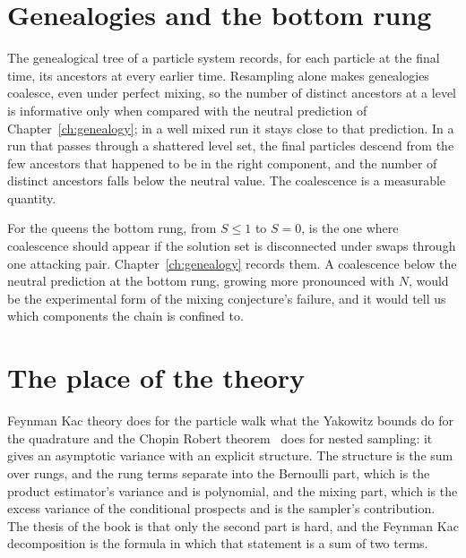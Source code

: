 \section{Genealogies and the bottom rung}

The genealogical tree of a particle system records, for each particle at the final time, its ancestors at every earlier time. Resampling alone makes genealogies coalesce, even under perfect mixing, so the number of distinct ancestors at a level is informative only when compared with the neutral prediction of Chapter~\ref{ch:genealogy}; in a well mixed run it stays close to that prediction. In a run that passes through a shattered level set, the final particles descend from the few ancestors that happened to be in the right component, and the number of distinct ancestors falls below the neutral value. The coalescence is a measurable quantity.

For the queens the bottom rung, from $S \le 1$ to $S = 0$, is the one where coalescence should appear if the solution set is disconnected under swaps through one attacking pair. Chapter~\ref{ch:genealogy} records them. A coalescence below the neutral prediction at the bottom rung, growing more pronounced with $N$, would be the experimental form of the mixing conjecture's failure, and it would tell us which components the chain is confined to.

\section{The place of the theory}

Feynman Kac theory does for the particle walk what the Yakowitz bounds do for the quadrature and the Chopin Robert theorem~\cite{ChopinRobert} does for nested sampling: it gives an asymptotic variance with an explicit structure. The structure is the sum over rungs, and the rung terms separate into the Bernoulli part, which is the product estimator's variance and is polynomial, and the mixing part, which is the excess variance of the conditional prospects and is the sampler's contribution. The thesis of the book is that only the second part is hard, and the Feynman Kac decomposition is the formula in which that statement is a sum of two terms.
